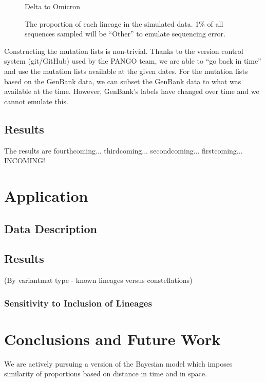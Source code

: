 \documentclass{article}
\begin{document}
\begin{figure}
Delta to Omicron
\caption{\label{deltacron}The proportion of each lineage in the simulated data. 1\% of all sequences sampled will be ``Other'' to emulate sequencing error.}
\end{figure}

Constructing the mutation lists is non-trivial.
Thanks to the version control system (git/GitHub) used by the PANGO team, we are able to ``go back in time'' and use the mutation lists available at the given dates.
For the mutation lists based on the GenBank data, we can subset the GenBank data to what was available at the time.
However, GenBank's labels have changed over time and we cannot emulate this.


\subsection{Results}

The results are fourthcoming... thirdcoming... secondcoming... firstcoming... INCOMING!




\section{Application}

\subsection{Data Description}

\subsection{Results}

(By variantmat type - known lineages versus constellations)

\subsubsection{Sensitivity to Inclusion of Lineages}

\section{Conclusions and Future Work}


We are actively pursuing a version of the Bayesian model which imposes similarity of proportions based on distance in time and in space.
\end{document}
